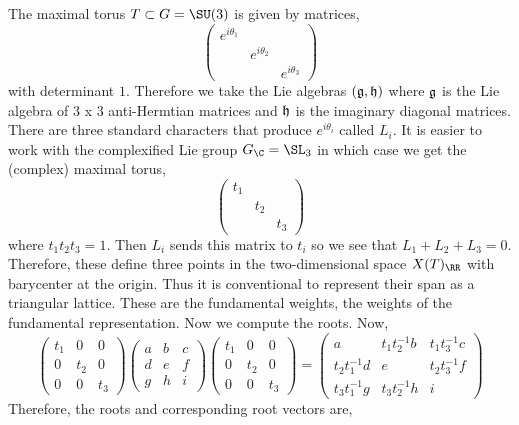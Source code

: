 \documentclass[12pt]{article}
\begin{document}
The maximal torus $T \subset G = \SU(3)$ is given by matrices,
\[ \begin{pmatrix}
e^{i \theta_1} 
\\
& e^{i \theta_2}
\\
& & e^{i \theta_3}
\end{pmatrix} \]
with determinant $1$. Therefore we take the Lie algebras $(\mathfrak{g}, \mathfrak{h})$ where $\mathfrak{g}$ is the Lie algebra of 3 x 3 anti-Hermtian matrices and $\mathfrak{h}$ is the imaginary diagonal matrices. 
\bigskip\\
There are three standard characters that produce $e^{i \theta_i}$ called $L_i$. It is easier to work with the complexified Lie group $G_{\C} = \SL_3$ in which case we get the (complex) maximal torus,
\[ \begin{pmatrix}
t_1
\\
& t_2
\\
& & t_3
\end{pmatrix} \]
where $t_1 t_2 t_3 = 1$. Then $L_i$ sends this matrix to $t_i$ so we see that $L_1 + L_2 + L_3 = 0$. Therefore, these define three points in the two-dimensional space $X(T)_{\RR}$ with barycenter at the origin. Thus it is conventional to represent their span as a triangular lattice. These are the fundamental weights, the weights of the fundamental representation. Now we compute the roots. 
Now,
\[ 
\begin{pmatrix}
t_1 & 0 & 0
\\
0 & t_2 & 0
\\
0 & 0 & t_3
\end{pmatrix}
\begin{pmatrix}
a & b & c
\\
d & e & f
\\
g & h & i
\end{pmatrix}
\begin{pmatrix}
t_1 & 0 & 0
\\
0 & t_2 & 0
\\
0 & 0 & t_3
\end{pmatrix}
= 
\begin{pmatrix}
a & t_1 t_2^{-1} b & t_1 t_3^{-1} c
\\
t_2 t_1^{-1} d & e & t_2 t_3^{-1} f
\\
t_3 t_1^{-1} g & t_3 t_2^{-1} h & i
\end{pmatrix} \]
Therefore, the roots and corresponding root vectors are,
\end{document}
